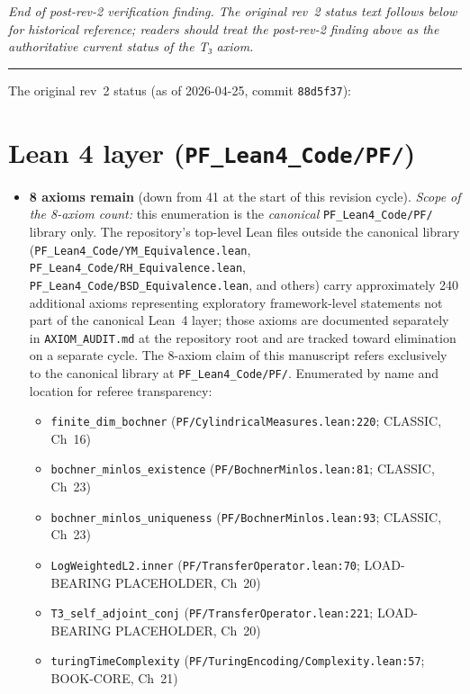 \textit{End of post-rev-2 verification finding. The original rev~2
status text follows below for historical reference; readers should
treat the post-rev-2 finding above as the authoritative current
status of the T₃ axiom.}

\bigskip
\noindent\rule{\textwidth}{0.4pt}
\bigskip

The original rev~2 status (as of 2026-04-25, commit \texttt{88d5f37}):

\section*{Lean 4 layer (\texttt{PF\_Lean4\_Code/PF/})}

\begin{itemize}
\item \textbf{8 axioms remain} (down from 41 at the start of this revision cycle).
  \emph{Scope of the 8-axiom count:} this enumeration is the \emph{canonical} \texttt{PF\_Lean4\_Code/PF/} library only. The repository's top-level Lean files outside the canonical library (\texttt{PF\_Lean4\_Code/YM\_Equivalence.lean}, \texttt{PF\_Lean4\_Code/RH\_Equivalence.lean}, \texttt{PF\_Lean4\_Code/BSD\_Equivalence.lean}, and others) carry approximately 240 additional axioms representing exploratory framework-level statements not part of the canonical Lean~4 layer; those axioms are documented separately in \texttt{AXIOM\_AUDIT.md} at the repository root and are tracked toward elimination on a separate cycle. The 8-axiom claim of this manuscript refers exclusively to the canonical library at \texttt{PF\_Lean4\_Code/PF/}.
  Enumerated by name and location for referee transparency:
  \begin{itemize}
  \item \texttt{finite\_dim\_bochner} \hfill (\texttt{PF/CylindricalMeasures.lean:220}; CLASSIC, Ch~16)
  \item \texttt{bochner\_minlos\_existence} \hfill (\texttt{PF/BochnerMinlos.lean:81}; CLASSIC, Ch~23)
  \item \texttt{bochner\_minlos\_uniqueness} \hfill (\texttt{PF/BochnerMinlos.lean:93}; CLASSIC, Ch~23)
  \item \texttt{LogWeightedL2.inner} \hfill (\texttt{PF/TransferOperator.lean:70}; LOAD-BEARING PLACEHOLDER, Ch~20)
  \item \texttt{T3\_self\_adjoint\_conj} \hfill (\texttt{PF/TransferOperator.lean:221}; LOAD-BEARING PLACEHOLDER, Ch~20)
  \item \texttt{turingTimeComplexity} \hfill (\texttt{PF/TuringEncoding/Complexity.lean:57}; BOOK-CORE, Ch~21)

\end{itemize}
\end{itemize}
